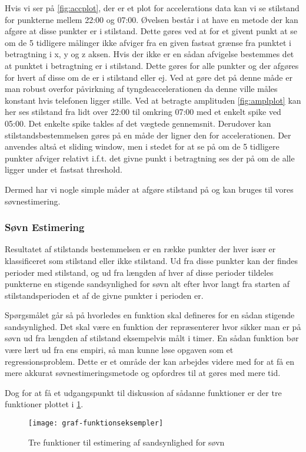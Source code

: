 Hvis vi ser på \cref{fig:accplot}, der er et plot for accelerations data kan vi se stilstand for punkterne mellem 22:00 og 07:00.
Øvelsen består i at have en metode der kan afgøre at disse punkter er i stilstand.
Dette gøres ved at for et givent punkt at se om de 5 tidligere målinger ikke afviger fra en given fastsat grænse fra punktet i betragtning i x, y og z aksen.
Hvis der ikke er en sådan afvigelse bestemmes det at punktet i betragtning er i stilstand.
Dette gøres for alle punkter og der afgøres for hvert af disse om de er i stilstand eller ej.
Ved at gøre det på denne måde er man robust overfor påvirkning af tyngdeaccelerationen da denne ville måles konstant hvis telefonen ligger stille.
Ved at betragte amplituden \cref{fig:amplplot} kan her ses stilstand fra lidt over 22:00 til omkring 07:00 med et enkelt spike ved 05:00.
Det enkelte spike takles af det vægtede gennemsnit.
Derudover kan stilstandsbestemmelsen gøres på en måde der ligner den for accelerationen.
Der anvendes altså et sliding window, men i stedet for at se på om de 5 tidligere punkter afviger relativt i.f.t. det givne punkt i betragtning ses der på om de alle ligger under et fastsat threshold.

Dermed har vi nogle simple måder at afgøre stilstand på og kan bruges til vores søvnestimering.
\subsubsection{Søvn Estimering}
Resultatet af stilstands bestemmelsen er en række punkter der hver især er klassificeret som stilstand eller ikke stilstand.
Ud fra disse punkter kan der findes perioder med stilstand, og ud fra længden af hver af disse perioder tildeles punkterne en stigende sandsynlighed for søvn alt efter hvor langt fra starten af stilstandsperioden et af de givne punkter i perioden er.


Spørgsmålet går så på hvorledes en funktion skal defineres for en sådan stigende sandsynlighed.
Det skal være en funktion der repræsenterer hvor sikker man er på søvn ud fra længden af stilstand eksempelvis målt i timer.
En sådan funktion bør være lært ud fra ens empiri, så man kunne løse opgaven som et regressionsproblem.
Dette er et område der kan arbejdes videre med for at få en mere akkurat søvnestimeringsmetode og opfordres til at gøres med mere tid.

Dog for at få et udgangspunkt til diskussion af sådanne funktioner er der tre funktioner plottet i \cref{fig:trefunc}.
\begin{figure}[h]
	\centering
	\texttt{[image: graf-funktionseksempler]}
	\caption{Tre funktioner til estimering af sandsynlighed for søvn}\label{fig:trefunc}
\end{figure}

